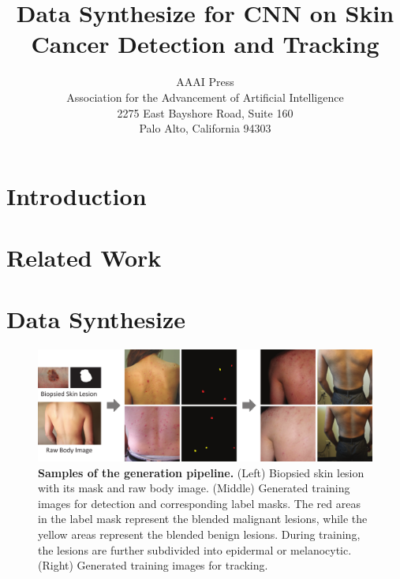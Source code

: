 \documentclass[letterpaper]{article}
\begin{document}
%
\title{Data Synthesize for CNN on Skin Cancer Detection and Tracking}
\author{AAAI Press\\
Association for the Advancement of Artificial Intelligence\\
2275 East Bayshore Road, Suite 160\\
Palo Alto, California 94303\\
}
\maketitle
\begin{abstract}
 
\end{abstract}


\section{Introduction}


\section{Related Work}


\section{Data Synthesize}

\begin{figure}[h!]
  \centering
  \includegraphics[width=\textwidth]{./blend.pdf}
  \caption{{\bf Samples of the generation pipeline.} (Left) Biopsied skin lesion with its mask and raw body image. (Middle) Generated training images for detection and corresponding label masks. The red areas in the label mask represent the blended malignant lesions, while the yellow areas represent the blended benign lesions. During training, the lesions are further subdivided into epidermal or melanocytic. (Right) Generated training images for tracking.}
  \label{fig:poisson}
\end{figure}
\end{document}
